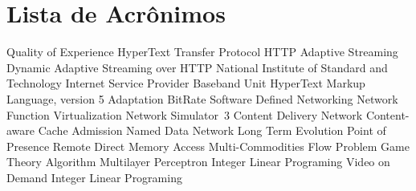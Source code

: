 \section*{Lista de Acrônimos}

\vspace{0.8cm}

\begin{acronym}[CSMA/CA]
	\itemsep0.5pt
	      {Quality of Experience}
	     {HyperText Transfer Protocol}
			{HTTP Adaptive Streaming}  
			{Dynamic Adaptive Streaming over HTTP}  
			{National Institute of Standard and Technology}
			{Internet Service Provider} 
			{Baseband Unit}
		{HyperText Markup Language, version 5} 
			{Adaptation BitRate}
	      {Software Defined Networking}
	      {Network Function Virtualization}
	     {Network Simulator~3}
	      {Content Delivery Network}
	     {Content-aware Cache Admission}
	      {Named Data Network}
	      {Long Term Evolution}
	      {Point of Presence}
	     {Remote Direct Memory Access}
	     {Multi-Commodities Flow Problem}
	      {Game Theory Algorithm}
	      {Multilayer Perceptron}
	      {Integer Linear Programing}
	      {Video on Demand}
	      {Integer Linear Programing}
	
\end{acronym}

